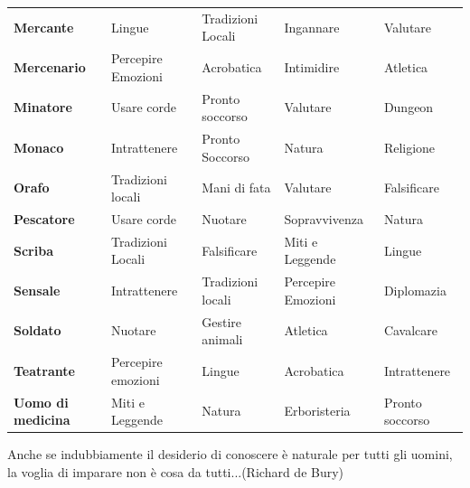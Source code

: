 \begin{tabularx}{0.95\textwidth}{lllll}
\textbf{Mercante}& Lingue&Tradizioni Locali&Ingannare&Valutare\\
\textbf{Mercenario} & Percepire Emozioni & Acrobatica & Intimidire & Atletica\\
\textbf{Minatore}& Usare corde&Pronto soccorso&Valutare&Dungeon\\
\textbf{Monaco} & Intrattenere &Pronto Soccorso & Natura & Religione\\
\textbf{Orafo} & Tradizioni locali & Mani di fata & Valutare & Falsificare\\
\textbf{Pescatore}& Usare corde&Nuotare&Sopravvivenza&Natura\\
\textbf{Scriba} &Tradizioni Locali& Falsificare & Miti e Leggende & Lingue\\
\textbf{Sensale} & Intrattenere & Tradizioni locali & Percepire Emozioni & Diplomazia\\
\textbf{Soldato}& Nuotare&Gestire animali&Atletica&Cavalcare\\
\textbf{Teatrante}& Percepire emozioni& Lingue&Acrobatica&Intrattenere\\
\textbf{Uomo di medicina}& Miti e Leggende&Natura&Erboristeria&Pronto soccorso
\end{tabularx}

\vfill

\begin{changemargin}{0.3cm}{0.3cm}\begin{enfasi}{
Anche se indubbiamente il desiderio di conoscere è naturale per tutti gli uomini, la voglia di imparare non è cosa da tutti...(Richard de Bury)
}\end{enfasi}\end{changemargin}


